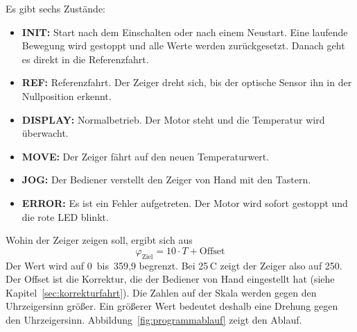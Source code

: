 Es gibt sechs Zustände:
\begin{itemize}[itemsep=0pt, topsep=2pt]
    \item \textbf{INIT:} Start nach dem Einschalten oder nach einem Neustart. Eine laufende Bewegung wird gestoppt und alle Werte werden zurückgesetzt. Danach geht es direkt in die Referenzfahrt.
    \item \textbf{REF:} Referenzfahrt. Der Zeiger dreht sich, bis der optische Sensor ihn in der Nullposition erkennt.
    \item \textbf{DISPLAY:} Normalbetrieb. Der Motor steht und die Temperatur wird überwacht.
    \item \textbf{MOVE:} Der Zeiger fährt auf den neuen Temperaturwert.
    \item \textbf{JOG:} Der Bediener verstellt den Zeiger von Hand mit den Tastern.
    \item \textbf{ERROR:} Es ist ein Fehler aufgetreten. Der Motor wird sofort gestoppt und die rote LED blinkt.
\end{itemize}

Wohin der Zeiger zeigen soll, ergibt sich aus
\[
\varphi_{\mathrm{Ziel}} = 10 \cdot T + \text{Offset}
\]
Der Wert wird auf \mbox{0 bis 359{,}9\textdegree{}} begrenzt. Bei 25\,\textdegree C zeigt der Zeiger also auf 250. 
Der Offset ist die Korrektur, die der Bediener von Hand eingestellt hat (siehe Kapitel~\ref{sec:korrekturfahrt}). 
Die Zahlen auf der Skala werden gegen den Uhrzeigersinn größer. Ein größerer Wert bedeutet deshalb eine Drehung gegen den Uhrzeigersinn.
Abbildung~\ref{fig:programmablauf} zeigt den Ablauf.

